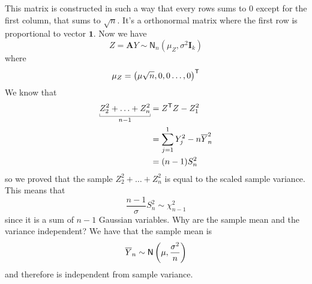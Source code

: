 \documentclass[12pt]{report}
\begin{document}
This matrix is constructed in such a way that every rows sums to 0 except for the first column, that sums to $\sqrt{n}$. It's a orthonormal matrix where the first row is proportional to vector $\mathbf{1}$. Now we have
\begin{equation*}
	Z=\mathbf{A}Y\sim\mathsf{N}_{n}\left(\mu_{Z},\sigma^{2}\mathbf{I}_{k}\right)
\end{equation*}
where
\begin{equation*}
	\mu_{Z}=\left(\mu\sqrt{n},0,0\ldots,0\right)^{\mathsf{T}}
\end{equation*}
We know that
\begin{align*}
	\ubracketthin{Z_{2}^{2}+\ldots+Z_{n}^{2}}_{n-1}&=Z^{\trsp}Z-Z_{1}^{2}\\
	&=\sum_{j=1}^{1}Y^{2}_{j}-n\Ybar_{n}^{2}\\
	&=(n-1)S^{2}_{n}
\end{align*}
so we proved that the sample \rv{} $Z_{2}^{2}+\ldots+Z^{2}_{n}$ is equal to the scaled sample variance. This means that
\begin{equation*}
	\frac{n-1}{\sigma}S^{2}_{n}\sim\chi^{2}_{n-1}
\end{equation*}
since it is a sum of $n-1$ Gaussian variables.
Why are the sample mean and the variance independent? We have that the sample mean is
\begin{equation*}
	\overline{Y}_{n}\sim\mathsf{N}\left(\mu,\frac{\sigma^{2}}{n}\right)
\end{equation*}
and therefore is independent from sample variance.
\end{document}
